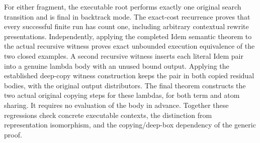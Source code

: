 For either fragment, the executable root performs exactly one original
search transition and is final in backtrack mode. The exact-cost recurrence
proves that every successful finite run has count one, including arbitrary
contextual rewrite presentations. Independently, applying the completed Idem
semantic theorem to the actual recursive witness proves exact unbounded
execution equivalence of the two closed examples.
A second recursive witness inserts each literal Idem pair into a genuine
lambda body with an unused bound output. Applying the established deep-copy
witness construction keeps the pair in both copied residual bodies, with the
original output distributors. The final theorem constructs the two actual
original copying steps for these lambdas, for both term and atom sharing.
It requires no evaluation of the body in advance. Together these regressions
check concrete executable contexts, the distinction from representation
isomorphism, and the copying/deep-box dependency of the generic proof.
